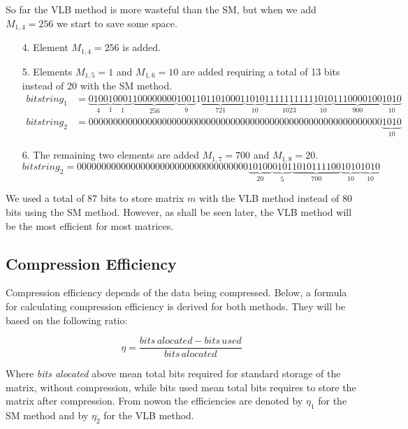 \documentclass[10pt]{article}
\begin{document}
So far the VLB method is more wasteful than the SM, but when we add $M_{1,4} =256$  we start to save some space.

\begin{enumerate}
 \item[4.] Element $M_{1,4} =256$ is added.  
 \item [5.] Elements $M_{1,5} =1$ and $M_{1,6} =10$ are added requiring a total of 13 bits instead of 20 with the SM method.
 \begin{align*} \label{eq:16}
 bitstring_1 &=
 \underbrace{0100}_{4}\underbrace{1}_{1}\underbrace{0001}_{1}\underbrace{100000000}_{256}\underbrace{1001}_{9}\underbrace{1011010001}_{721}\underbrace{1010}_{10}\underbrace{1111111111}_{1023}\underbrace{1010}_{10}\underbrace{1110000100}_{900}\underbrace{1010}_{10} \\
 bitstring_2 &= 000000000000000000000000000000000000000000000000000000000000\underbrace{1010}_{10}
\end{align*}
 \item [6.] The remaining two elements are added $M_{1,7} =700$ and $M_{1,8} =20$.
 \begin{equation*} \label{eq:18}
 bitstring_2 = 00000000000000000000000000000000000\underbrace{10100}_{20}\underbrace{0101}_{5}\underbrace{1010111100}_{700}\underbrace{1010}_{10}\underbrace{1010}_{10}
\end{equation*}
\end{enumerate}





 We used a total of 87 bits to store matrix $m$ with the VLB method instead of 80 bits using the SM method. However, as shall be seen later, the VLB method will be the most efficient for most matrices.
 
 \subsection*{Compression Efficiency}
 Compression efficiency depends of the data being compressed. Below, a formula for calculating compression efficiency is derived for both methods. They will be based on the following ratio:
 
 \begin{equation}\label{eq:eff1}
  \eta=\frac{bits\, alocated-bits\, used}{bits\,alocated}
 \end{equation}
 
 Where \textit{bits alocated} above mean total bits required for standard storage of the matrix, without compression, while bits used mean total bits requires to store the matrix after compression. From nowon the efficiencies are denoted by $\eta_1$ for the SM method and by $\eta_2$ for the VLB method. 
\end{document}
